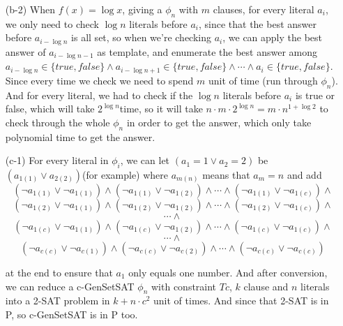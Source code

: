 \documentclass{homework}
\begin{document}
\begin{itemize}
    \item[(b-2)]
    When $f(x) = \log{x}$, giving a $\phi_n$ with $m$ clauses, for every literal $a_i$, we only need to check $\log{n}$ literals before $a_i$, since that the best answer before $a_{i-\log{n}}$ is all set, so when we're checking $a_i$, we can apply the best answer of $a_{i-\log{n}-1}$ as template, and enumerate the best answer among $a_{i-\log{n}}\in\{true,false\}\wedge a_{i-\log{n}+1}\in\{true,false\}\wedge \cdots \wedge a_{i}\in\{true,false\}$.\\
    Since every time we check we need to spend $m$ unit of time (run through $\phi_n$). And for every literal, we had to check if the $\log{n}$ literals before $a_i$ is true or false, which will take $2^{\log{n}}$time, so it will take $n \cdot m \cdot 2^{\log{n}} = m\cdot n^{1+\log 2}$ to check through the whole $\phi_n$ in order to get the answer, which only take polynomial time to get the answer.\\

    \item[(c-1)]
    For every literal in $\phi_i$, we can let $(a_1 = 1\vee a_2 = 2)$ be 
    $(a_{1(1)}\vee a_{2(2)})$(for example) where $a_{m(n)}$ means that $a_m = n$ and add 
    \[(\lnot a_{1(1)} \vee \lnot a_{1(1)}) \wedge (\lnot a_{1(1)} \vee \lnot a_{1(2)}) \wedge \cdots \wedge (\lnot a_{1(1)} \vee \lnot a_{1(c)}) \wedge \]
    \[(\lnot a_{1(2)} \vee \lnot a_{1(1)}) \wedge (\lnot a_{1(2)} \vee \lnot a_{1(2)}) \wedge \cdots \wedge (\lnot a_{1(2)} \vee \lnot a_{1(c)}) \wedge \]
    \[\cdots\wedge\]
    \[(\lnot a_{1(c)} \vee \lnot a_{1(1)}) \wedge (\lnot a_{1(c)} \vee \lnot a_{1(2)}) \wedge \cdots \wedge (\lnot a_{1(c)} \vee \lnot a_{1(c)})\wedge\]
    \[\cdots\wedge\]
    \[(\lnot a_{c(c)} \vee \lnot a_{c(1)}) \wedge (\lnot a_{c(c)} \vee \lnot a_{c(2)}) \wedge \cdots \wedge (\lnot a_{c(c)} \vee \lnot a_{c(c)})\]

    at the end to ensure that $a_1$ only equals one number.
    And after conversion, we can reduce a c-GenSetSAT $\phi_n$ with constraint $Tc$, $k$ clause and $n$ literals into a 2-SAT problem in $k+n\cdot c^2$ unit of times. And since that 2-SAT is in P, so c-GenSetSAT is in P too.


\end{itemize}
\end{document}
